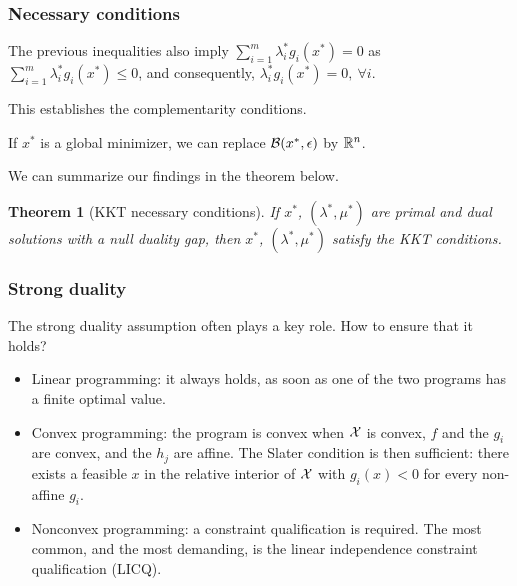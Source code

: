 \documentclass[usepdftitle=false,aspectratio=169]{beamer}
\newtheorem{thm}{Theorem}
\def\red{\color{red}}
\begin{document}
\begin{frame}
	\frametitle{Necessary conditions}
	
	The previous inequalities also imply $\sum_{i = 1}^m \lambda_i^* g_i(x^*) = 0$ as $\sum_{i = 1}^m \lambda_i^* g_i(x^*) \leq 0$, and consequently, $\lambda_i^* g_i(x^*) = 0,\ \forall i$.
	
	\mbox{}
	
	This establishes the complementarity conditions.
	
	\mbox{}
	
	If $x^*$ is a global minimizer, we can replace ${\mathcal{B}}(x^*,\epsilon)$ by ${\mathbb{R}}^n$.
	
	\mbox{}
	
	We can summarize our findings in the theorem below.
\begin{thm}[KKT necessary conditions]
	If $x^*$, $(\lambda^*, \mu^*)$ are primal and dual solutions with a null duality gap, then $x^*$, $(\lambda^*, \mu^*)$ satisfy the KKT conditions.
\end{thm}

\end{frame}

\begin{frame}
\frametitle{Strong duality}

\mbox{}

The strong duality assumption often plays a key role. How to ensure that it holds?
\begin{itemize}
\item
{\red Linear programming}: it always holds, as soon as one of the two programs has a finite optimal value.
\item
{\red Convex programming}: the program is convex when ${\mathcal{X}}$ is convex, $f$ and the $g_i$ are convex, and the $h_j$ are affine.
The {\red Slater condition} is then sufficient: there exists a feasible $x$ in the relative interior of ${\mathcal{X}}$ with $g_i(x) < 0$ for every non-affine $g_i$.
\item
{\red Nonconvex programming}: a constraint qualification is required. The most common, and the most demanding, is the linear independence constraint qualification (LICQ).
\end{itemize}

\end{frame}
\end{document}
